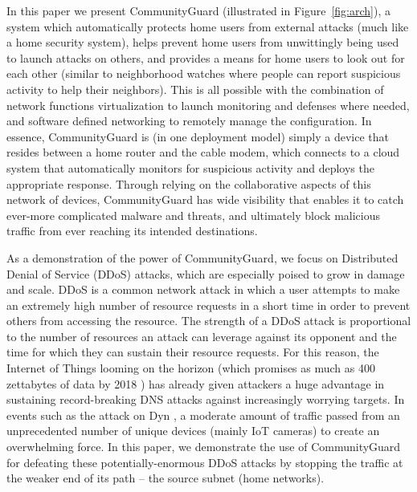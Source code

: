 In this paper we present CommunityGuard (illustrated in Figure~\ref{fig:arch}), a system which automatically protects home users from external attacks (much like a home security system), helps prevent home users from unwittingly being used to launch attacks on others, and provides a means for home users to look out for each other (similar to neighborhood watches where people can report suspicious activity to help their neighbors).  This is all possible with the combination of network functions virtualization to launch monitoring and defenses where needed, and software defined networking to remotely manage the configuration.  In essence, CommunityGuard is (in one deployment model) simply a device that resides between a home router and the cable modem, which connects to a cloud system that automatically monitors for suspicious activity and deploys the appropriate response.  Through relying on the collaborative aspects of this network of devices, CommunityGuard has wide visibility that enables it to catch ever-more complicated malware and threats, and ultimately block malicious traffic from ever reaching its intended destinations. 

As a demonstration of the power of CommunityGuard, we focus on Distributed Denial of Service (DDoS) attacks, which are especially poised to grow in damage and scale.  DDoS is a common network attack in which a user attempts to make an extremely high number of resource requests in a short time in order to prevent others from accessing the resource. The strength of a DDoS attack is proportional to the number of resources an attack can leverage against its opponent and the time for which they can sustain their resource requests. For this reason, the Internet of Things looming on the horizon (which promises as much as 400 zettabytes of data by 2018 \cite{zetta}) has already given attackers a huge advantage in sustaining record-breaking DNS attacks against increasingly worrying targets. In events such as the attack on Dyn \cite{dyn}, a moderate amount of traffic passed from an unprecedented number of unique devices (mainly IoT cameras) to create an overwhelming force.  In this paper, we demonstrate the use of CommunityGuard for defeating these potentially-enormous DDoS attacks by stopping the traffic at the weaker end of its path -- the source subnet (home networks). 




